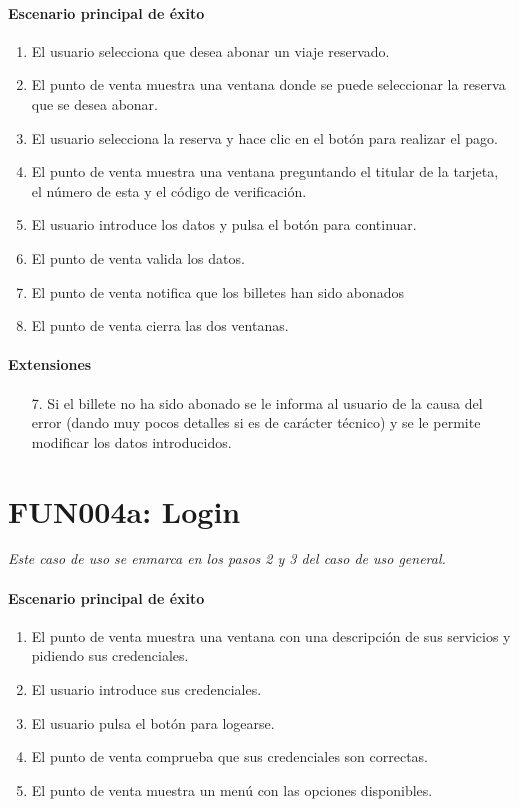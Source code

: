   \paragraph{Escenario principal de éxito}
  \begin{enumerate}
    \item El usuario selecciona que desea abonar un viaje reservado.
    \item El punto de venta muestra una ventana donde se puede seleccionar la reserva que se desea abonar.
    \item El usuario selecciona la reserva y hace clic en el botón para realizar el pago.
    \item El punto de venta muestra una ventana preguntando el titular de la tarjeta, el número de esta y el código de verificación.
    \item El usuario introduce los datos y pulsa el botón para continuar.
    \item El punto de venta valida los datos.
    \item El punto de venta notifica que los billetes han sido abonados
    \item El punto de venta cierra las dos ventanas.
  \end{enumerate}
  \paragraph{Extensiones}
  \begin{enumerate}
    \item[7.] Si el billete no ha sido abonado se le informa al usuario de la causa del error (dando muy pocos detalles si es de carácter técnico) y se le permite modificar los datos introducidos.
  \end{enumerate}



\section{FUN004a: Login}
  \emph{Este caso de uso se enmarca en los pasos 2 y 3 del caso de uso general.}
  \paragraph{Escenario principal de éxito}
  \begin{enumerate}
    \item El punto de venta muestra una ventana con una descripción de sus servicios y pidiendo sus credenciales.
    \item El usuario introduce sus credenciales.
    \item El usuario pulsa el botón para logearse.
    \item El punto de venta comprueba que sus credenciales son correctas.
    \item El punto de venta muestra un menú con las opciones disponibles.
  \end{enumerate}
